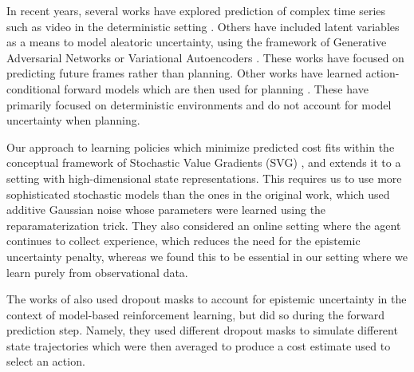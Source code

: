\documentclass{article} %
\begin{document}
In recent years, several works have explored prediction of complex time series such as video in the deterministic setting \citep{VPN,Srivastava15,DentonB17}.
Others have included latent variables as a means to model aleatoric uncertainty, using the framework of Generative Adversarial Networks \citep{mathieu-iclr-2016} or Variational Autoencoders \citep{Villegas17, Babaeizadeh2018, Denton2018}. These works have focused on predicting future frames rather than planning.
Other works have learned action-conditional forward models which are then used for planning \citep{Oh15, FinnGL16, Poke, VPN, UPN}. These have primarily focused on deterministic environments and do not account for model uncertainty when planning.


Our approach to learning policies which minimize predicted cost fits within the conceptual framework of Stochastic Value Gradients (SVG) \citep{SVG}, and extends it to a setting with high-dimensional state representations.
This requires us to use more sophisticated stochastic models than the ones in the original work, which used additive Gaussian noise whose parameters were learned using the reparamaterization trick.
They also considered an online setting where the agent continues to collect experience, which reduces the need for the epistemic uncertainty penalty, whereas we found this to be essential in our setting where we learn purely from observational data.

The works of \citep{DeepPilco, Chua2018} also used dropout masks to account for epistemic uncertainty in the context of model-based reinforcement learning, but did so during the forward prediction step. Namely, they used different dropout masks to simulate different state trajectories which were then averaged to produce a cost estimate used to select an action.
\end{document}

